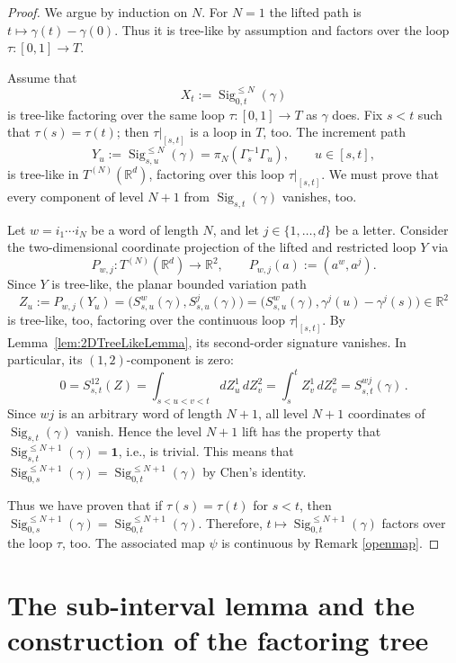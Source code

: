 \documentclass[11pt]{article}
\theoremstyle{definition}
\newcommand{\R}{\mathbb{R}}
\newcommand{\Sig}{\operatorname{Sig}}
\newcommand{\id}{\mathbf{1}}
\newcommand{\proj}[1]{\pi_{#1}}
\begin{document}
\begin{proof}
We argue by induction on $N$. For $N=1$ the lifted path is $t\mapsto \gamma(t)-\gamma(0)$. Thus it is tree-like by assumption and factors over the loop $\tau:[0,1] \to T $.

Assume that
\[
  X_t:=\Sig^{\leq N}_{0,t}(\gamma)
\]
is tree-like factoring over the same loop $ \tau:[0,1] \to T$ as $\gamma$ does. Fix $s<t$ such that $\tau(s)=\tau(t)$; then $\tau|_{[s,t]}$ is a loop in $T$, too. The increment path
\[
  Y_u:=\Sig^{\leq N}_{s,u}(\gamma) = \proj{N}(\Gamma_s^{-1} \Gamma_u),
  \qquad u\in[s,t],
\]
is  tree-like  in \(T^{(N)}(\R^d)\), factoring over this loop $ \tau|_{[s,t]}$. We must prove that every component of level $N+1$ from $\Sig_{s,t}(\gamma)$ vanishes, too.

Let $ w=i_1\cdots i_N$ be a word of length $N$, and let $ j\in\{1,\ldots,d\}$ be a letter. Consider the 
two-dimensional coordinate projection of the lifted and restricted loop $Y$ via 
\[
  P_{w,j}:T^{(N)}(\R^d)\to\R^2,
  \qquad
  P_{w,j}(a):=(a^w,a^j).
\]
Since $Y$ is tree-like, the planar bounded variation path
\[
  Z_u:=P_{w,j}(Y_u)
  =\bigl(S^w_{s,u}(\gamma),S^j_{s,u}(\gamma)\bigr)
  =\bigl(S^w_{s,u}(\gamma),\gamma^j(u)-\gamma^j(s)\bigr) \in \R^2
\]
is tree-like, too,  factoring over the continuous loop $ \tau|_{[s,t]}$. By   Lemma~\ref{lem:2DTreeLikeLemma}, 
its second-order signature vanishes. In particular, its $(1,2)$-component is zero:
\[
  0
  =S^{12}_{s,t}(Z)
  =\int_{s<u<v<t} dZ^1_u\,dZ^2_v
  =\int_s^t Z^1_v\,dZ^2_v = S^{wj}_{s,t}(\gamma) \, .
\]
Since $wj$ is an arbitrary word of length $N+1$, all level $ N+1 $ coordinates of $ \Sig_{s,t}(\gamma) $ vanish. Hence the level $ N+1 $ lift has the property that $ \Sig^{\leq N+1}_{s,t}(\gamma) = \id $, i.e., is trivial. This means that $ \Sig^{\leq N+1}_{0,s}(\gamma) = \Sig^{\leq N+1}_{0,t}(\gamma) $ by Chen's identity.

Thus we have proven that if $\tau(s) = \tau(t)$ for $ s < t $, then  $ \Sig^{\leq N+1}_{0,s}(\gamma) = \Sig^{\leq N+1}_{0,t}(\gamma) $. Therefore, $ t\longmapsto \Sig^{\leq N+1}_{0,t}(\gamma) $ factors over the loop $\tau$, too. The associated map $\psi $ is continuous by Remark \ref{openmap}.
\end{proof}

\section{The sub-interval lemma and the construction of the factoring tree}\label{sec:subinterval_lemma}
\end{document}
